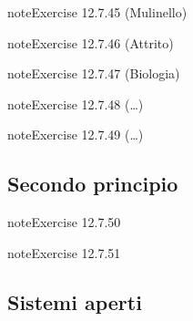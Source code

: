 \documentclass[letterpaper,10pt,italian]{jupyterBook}
\begin{document}
\begin{sphinxadmonition}{note}{Exercise 12.7.45 (Mulinello)}


\end{sphinxadmonition}
 \label{exercise:ch/thermodynamics/principles-problems-exercise-45}

\begin{sphinxadmonition}{note}{Exercise 12.7.46 (Attrito)}


\end{sphinxadmonition}
 \label{exercise:ch/thermodynamics/principles-problems-exercise-46}

\begin{sphinxadmonition}{note}{Exercise 12.7.47 (Biologia)}


\end{sphinxadmonition}
 \label{exercise:ch/thermodynamics/principles-problems-exercise-47}

\begin{sphinxadmonition}{note}{Exercise 12.7.48 (…)}


\end{sphinxadmonition}
 \label{exercise:ch/thermodynamics/principles-problems-exercise-48}

\begin{sphinxadmonition}{note}{Exercise 12.7.49 (…)}


\end{sphinxadmonition}


\subsection{Secondo principio}
\label{\detokenize{ch/thermodynamics/principles-problems:secondo-principio}} \label{exercise:ch/thermodynamics/principles-problems-exercise-49}

\begin{sphinxadmonition}{note}{Exercise 12.7.50}


\end{sphinxadmonition}
 \label{exercise:ch/thermodynamics/principles-problems-exercise-50}

\begin{sphinxadmonition}{note}{Exercise 12.7.51}


\end{sphinxadmonition}


\subsection{Sistemi aperti}
\label{\detokenize{ch/thermodynamics/principles-problems:sistemi-aperti}} \label{exercise:ch/thermodynamics/principles-problems-exercise-51}
\end{document}

